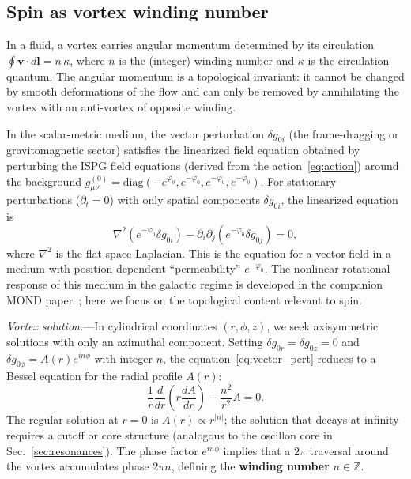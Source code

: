 \documentclass[aps,prd,onecolumn,superscriptaddress,nofootinbib,showpacs,12pt,notitlepage]{revtex4-2}
\begin{document}
\subsection{Spin as vortex winding number}
\label{sec:spin}

In a fluid, a vortex carries angular momentum determined by
its circulation $\oint \mathbf{v}\cdot d\mathbf{l} = n\,\kappa$,
where $n$ is the (integer) winding number and $\kappa$ is the
circulation quantum.  The angular momentum is a topological
invariant: it cannot be changed by smooth deformations of the
flow and can only be removed by annihilating the vortex with
an anti-vortex of opposite winding.

In the scalar-metric medium, the vector perturbation
$\delta g_{0i}$ (the frame-dragging or gravitomagnetic sector)
satisfies the linearized field equation obtained by perturbing
the ISPG field equations (derived from the action~\eqref{eq:action}) around the background
$g_{\mu\nu}^{(0)} = \mathrm{diag}(-e^{\varphi_0}, e^{-\varphi_0}, e^{-\varphi_0}, e^{-\varphi_0})$.
For stationary perturbations ($\partial_t = 0$) with only
spatial components $\delta g_{0i}$, the linearized equation is
\begin{equation}\label{eq:vector_pert}
  \nabla^2 (e^{-\varphi_0} \delta g_{0i}) - \partial_i \partial_j (e^{-\varphi_0} \delta g_{0j}) = 0,
\end{equation}
where $\nabla^2$ is the flat-space Laplacian.  This is the
equation for a vector field in a medium with position-dependent
``permeability'' $e^{-\varphi_0}$.  The nonlinear rotational
response of this medium in the galactic regime is developed
in the companion MOND paper~\cite{Lotishvili2026MOND}; here
we focus on the topological content relevant to spin.

\textit{Vortex solution.}---In cylindrical coordinates
$(r, \phi, z)$, we seek axisymmetric solutions with only an
azimuthal component.  Setting $\delta g_{0r} = \delta g_{0z} = 0$
and $\delta g_{0\phi} = A(r) e^{in\phi}$ with integer $n$, the
equation~\eqref{eq:vector_pert} reduces to a Bessel equation
for the radial profile $A(r)$:
\begin{equation}\label{eq:bessel_vortex}
  \frac{1}{r}\frac{d}{dr}\left(r \frac{dA}{dr}\right) - \frac{n^2}{r^2}A = 0.
\end{equation}
The regular solution at $r = 0$ is $A(r) \propto r^{|n|}$; the
solution that decays at infinity requires a cutoff or core
structure (analogous to the oscillon core in Sec.~\ref{sec:resonances}).
The phase factor $e^{in\phi}$ implies that a $2\pi$ traversal
around the vortex accumulates phase $2\pi n$, defining the
\textbf{winding number} $n \in \mathbb{Z}$.
\end{document}
